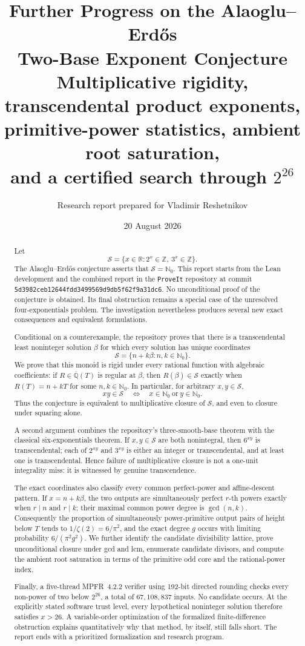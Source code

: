 \documentclass[11pt,oneside]{article}
\title{\bfseries Further Progress on the Alaoglu--Erd\H{o}s\\
Two-Base Exponent Conjecture\\[5pt]
\large Multiplicative rigidity, transcendental product exponents,\\
primitive-power statistics, ambient root saturation,\\
and a certified search through $2^{26}$}
\author{Research report prepared for Vladimir Reshetnikov}
\date{20 August 2026}
\theoremstyle{definition}
\newcommand{\Nzero}{\mathbb N_0}
\newcommand{\Z}{\mathbb Z}
\newcommand{\R}{\mathbb R}
\newcommand{\Qbar}{\overline{\mathbb Q}}
\newcommand{\Sol}{\mathcal S}
\newcommand{\commit}[1]{\texttt{#1}}
\begin{document}
\maketitle

\begin{abstract}
Let
\[
  \Sol=\{x\in\R:2^x\in\Z,\ 3^x\in\Z\}.
\]
The Alaoglu--Erd\H{o}s conjecture asserts that \(\Sol=\Nzero\).  This report starts from
the Lean development and the combined report in the \texttt{ProveIt} repository at commit
\commit{5d3982ceb12644fdd3499569d9db5f62f9a31dc6}.  No unconditional proof of the
conjecture is obtained.  Its final obstruction remains a special case of the unresolved
four-exponentials problem.  The investigation nevertheless produces several new exact
consequences and equivalent formulations.

Conditional on a counterexample, the repository proves that there is a transcendental least
noninteger solution \(\beta\) for which every solution has unique coordinates
\[
  \Sol=\{n+k\beta:n,k\in\Nzero\}.
\]
We prove that this monoid is rigid under every rational function with algebraic
coefficients: if \(R\in\Qbar(T)\) is regular at \(\beta\), then
\(R(\beta)\in\Sol\) exactly when \(R(T)=n+kT\) for some \(n,k\in\Nzero\).
In particular, for arbitrary \(x,y\in\Sol\),
\[
  xy\in\Sol\quad\Longleftrightarrow\quad x\in\Nzero\ \text{or}\ y\in\Nzero.
\]
Thus the conjecture is equivalent to multiplicative closure of \(\Sol\), and even to
closure under squaring alone.

A second argument combines the repository's three-smooth-base theorem with the classical
six-exponentials theorem.  If \(x,y\in\Sol\) are both nonintegral, then
\(6^{xy}\) is transcendental; each of \(2^{xy}\) and \(3^{xy}\) is either an
integer or transcendental, and at least one is transcendental.  Hence failure of
multiplicative closure is not a one-unit integrality miss: it is witnessed by genuine
transcendence.

The exact coordinates also classify every common perfect-power and affine-descent pattern.
If \(x=n+k\beta\), the two outputs are simultaneously perfect \(r\)-th powers exactly
when \(r\mid n\) and \(r\mid k\); their maximal common power degree is
\(\gcd(n,k)\).  Consequently the proportion of simultaneously power-primitive output
pairs of height below \(T\) tends to \(1/\zeta(2)=6/\pi^2\), and the exact degree
\(g\) occurs with limiting probability \(6/(\pi^2g^2)\).  We further identify the
candidate divisibility lattice, prove unconditional closure under gcd and lcm, enumerate
candidate divisors, and compute the ambient root saturation in terms of the primitive odd
core and the rational-power index.

Finally, a five-thread MPFR~4.2.2 verifier using 192-bit directed rounding checks every
non-power of two below \(2^{26}\), a total of \(67{,}108{,}837\) inputs.  No candidate
occurs.  At the explicitly stated software trust level, every hypothetical noninteger
solution therefore satisfies \(x>26\).  A variable-order optimization of the formalized
finite-difference obstruction explains quantitatively why that method, by itself, still
falls short.  The report ends with a prioritized formalization and research program.
\end{abstract}
\end{document}
